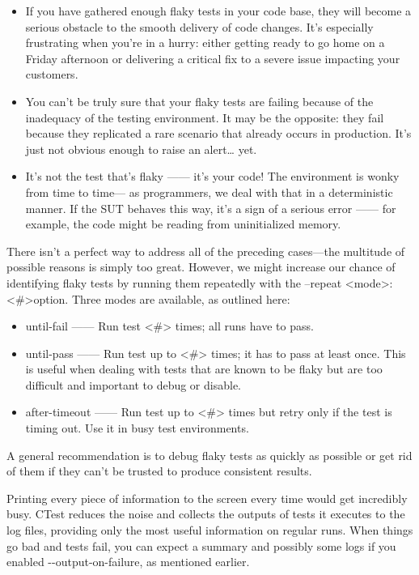 \begin{itemize}
\item
If you have gathered enough flaky tests in your code base, they will become a serious obstacle to the smooth delivery of code changes. It’s especially frustrating when you’re in a hurry: either getting ready to go home on a Friday afternoon or delivering a critical fix to a severe issue impacting your customers.

\item
You can’t be truly sure that your flaky tests are failing because of the inadequacy of the testing environment. It may be the opposite: they fail because they replicated a rare scenario that already occurs in production. It’s just not obvious enough to raise an alert… yet.

\item
It’s not the test that’s flaky —— it’s your code! The environment is wonky from time to time— as programmers, we deal with that in a deterministic manner. If the SUT behaves this way, it’s a sign of a serious error —— for example, the code might be reading from uninitialized memory.
\end{itemize}

There isn’t a perfect way to address all of the preceding cases—the multitude of possible reasons is simply too great. However, we might increase our chance of identifying flaky tests by running them repeatedly with the –repeat <mode>:<\#>option. Three modes are available, as outlined here:

\begin{itemize}
\item
until-fail —— Run test <\#> times; all runs have to pass.

\item
until-pass —— Run test up to <\#> times; it has to pass at least once. This is useful when dealing with tests that are known to be flaky but are too difficult and important to debug or disable.

\item
after-timeout —— Run test up to <\#> times but retry only if the test is timing out. Use it in busy test environments.
\end{itemize}

A general recommendation is to debug flaky tests as quickly as possible or get rid of them if they can’t be trusted to produce consistent results.


Printing every piece of information to the screen every time would get incredibly busy. CTest reduces the noise and collects the outputs of tests it executes to the log files, providing only the most useful information on regular runs. When things go bad and tests fail, you can expect a summary and possibly some logs if you enabled -{}-output-on-failure, as mentioned earlier.

